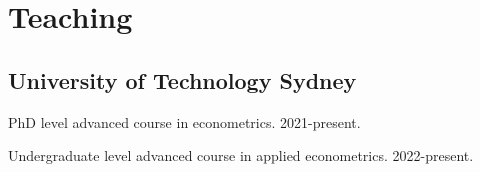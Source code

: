 \documentclass[10pt,letterpaper]{article}
\renewenvironment{itemize}{
  \begin{list}{}{
      \setlength{\leftmargin}{1.5em}
      \setlength{\itemsep}{0.25em}
      \setlength{\parskip}{0pt}
      \setlength{\parsep}{0.25em}
    }
}{
  \end{list}
}
\begin{document}
\section*{Teaching}

%

\subsection*{University of Technology Sydney}

\begin{itemize}
\item PhD level advanced course in econometrics. 2021-present.
\item Undergraduate level advanced course in applied econometrics. 2022-present.
\end{itemize}


\end{document}
